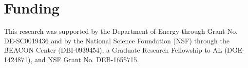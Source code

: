 
\section*{Funding}


This research was supported by the Department of Energy through Grant No. DE-SC0019436 and by the National Science Foundation (NSF) through the BEACON Center (DBI-0939454), a Graduate Research Fellowship to AL (DGE-1424871), and NSF Grant No. DEB-1655715. 

